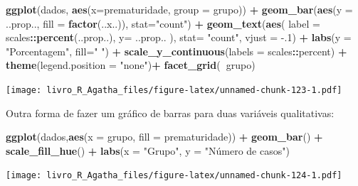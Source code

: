 \documentclass[
]{book}
\newenvironment{Shaded}{\begin{snugshade}}{\end{snugshade}}
\newcommand{\DataTypeTok}[1]{\textcolor[rgb]{0.13,0.29,0.53}{#1}}
\newcommand{\FloatTok}[1]{\textcolor[rgb]{0.00,0.00,0.81}{#1}}
\newcommand{\KeywordTok}[1]{\textcolor[rgb]{0.13,0.29,0.53}{\textbf{#1}}}
\newcommand{\NormalTok}[1]{#1}
\newcommand{\OperatorTok}[1]{\textcolor[rgb]{0.81,0.36,0.00}{\textbf{#1}}}
\newcommand{\StringTok}[1]{\textcolor[rgb]{0.31,0.60,0.02}{#1}}
\begin{document}
\begin{Shaded}
\begin{Highlighting}[]
\KeywordTok{ggplot}\NormalTok{(dados, }\KeywordTok{aes}\NormalTok{(}\DataTypeTok{x=}\NormalTok{prematuridade, }\DataTypeTok{group =}\NormalTok{ grupo))  }\OperatorTok{+}\StringTok{ }
\StringTok{  }\KeywordTok{geom_bar}\NormalTok{(}\KeywordTok{aes}\NormalTok{(}\DataTypeTok{y =}\NormalTok{ ..prop.., }\DataTypeTok{fill =} \KeywordTok{factor}\NormalTok{(..x..)), }\DataTypeTok{stat=}\StringTok{"count"}\NormalTok{) }\OperatorTok{+}
\StringTok{  }\KeywordTok{geom_text}\NormalTok{(}\KeywordTok{aes}\NormalTok{( }\DataTypeTok{label =}\NormalTok{ scales}\OperatorTok{::}\KeywordTok{percent}\NormalTok{(..prop..),}
                 \DataTypeTok{y=}\NormalTok{ ..prop.. ), }\DataTypeTok{stat=} \StringTok{"count"}\NormalTok{, }\DataTypeTok{vjust =} \FloatTok{-.1}\NormalTok{) }\OperatorTok{+}
\StringTok{  }\KeywordTok{labs}\NormalTok{(}\DataTypeTok{y =} \StringTok{"Porcentagem"}\NormalTok{, }\DataTypeTok{fill=}\StringTok{" "}\NormalTok{) }\OperatorTok{+}
\StringTok{  }\KeywordTok{scale_y_continuous}\NormalTok{(}\DataTypeTok{labels =}\NormalTok{ scales}\OperatorTok{::}\NormalTok{percent) }\OperatorTok{+}
\StringTok{  }\KeywordTok{theme}\NormalTok{(}\DataTypeTok{legend.position =} \StringTok{"none"}\NormalTok{)}\OperatorTok{+}
\StringTok{  }\KeywordTok{facet_grid}\NormalTok{(}\OperatorTok{~}\NormalTok{grupo)}
\end{Highlighting}
\end{Shaded}

\texttt{[image: livro\_R\_Agatha\_files/figure-latex/unnamed-chunk-123-1.pdf]}

Outra forma de fazer um gráfico de barras para duas variáveis qualitativas:

\begin{Shaded}
\begin{Highlighting}[]
\KeywordTok{ggplot}\NormalTok{(dados,}\KeywordTok{aes}\NormalTok{(}\DataTypeTok{x =}\NormalTok{ grupo, }\DataTypeTok{fill =}\NormalTok{ prematuridade)) }\OperatorTok{+}
\StringTok{  }\KeywordTok{geom_bar}\NormalTok{() }\OperatorTok{+}
\StringTok{  }\KeywordTok{scale_fill_hue}\NormalTok{() }\OperatorTok{+}
\StringTok{  }\KeywordTok{labs}\NormalTok{(}\DataTypeTok{x =} \StringTok{"Grupo"}\NormalTok{, }\DataTypeTok{y =} \StringTok{"Número de casos"}\NormalTok{)}
\end{Highlighting}
\end{Shaded}

\texttt{[image: livro\_R\_Agatha\_files/figure-latex/unnamed-chunk-124-1.pdf]}
\end{document}

